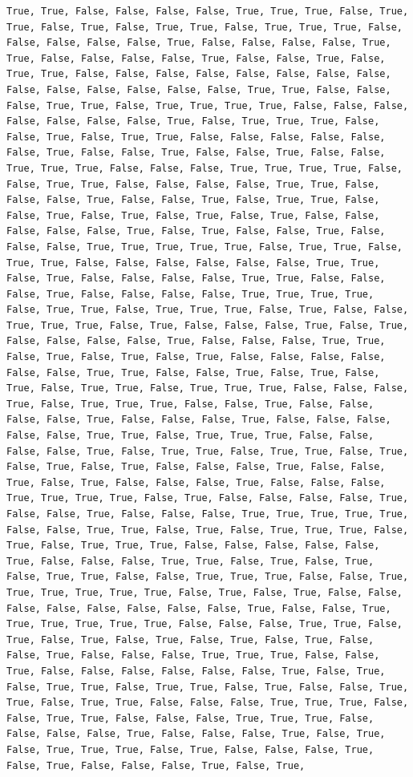 \documentclass[
  letterpaper,
  DIV=11,
  numbers=noendperiod]{scrartcl}
\begin{document}
\begin{verbatim}
True, True, False, False, False, False, True, True, True, False, True, True, False, True, False, True, True, False, True, True, True, False, False, False, False, False, True, False, False, False, False, True, True, False, False, False, False, True, False, False, True, False, True, True, False, False, False, False, False, False, False, False, False, False, False, False, False, False, True, True, False, False, False, True, True, False, True, True, True, True, False, False, False, False, False, False, False, True, False, True, True, True, False, False, True, False, True, True, False, False, False, False, False, False, True, False, False, True, False, False, True, False, False, True, True, True, False, False, False, True, True, True, True, False, False, True, True, False, False, False, False, True, True, False, False, False, True, False, False, True, False, True, True, False, False, True, False, True, False, True, False, True, False, False, False, False, False, True, False, True, False, False, True, False, False, False, True, True, True, True, True, False, True, True, False, True, True, False, False, False, False, False, False, True, True, False, True, False, False, False, False, True, True, False, False, False, True, False, False, False, False, True, True, True, True, False, True, True, False, True, True, True, False, True, False, False, True, True, True, False, True, False, False, False, True, False, True, False, False, False, False, True, False, False, False, True, True, False, True, False, True, False, True, False, False, False, False, False, False, True, True, False, False, True, False, True, False, True, False, True, True, False, True, True, True, False, False, False, True, False, True, True, True, False, False, True, False, False, False, False, True, False, False, False, True, False, False, False, False, False, True, True, False, True, True, True, False, False, False, False, True, False, True, True, False, True, True, False, True, False, True, False, True, False, False, False, True, False, False, True, False, True, False, False, False, True, False, False, False, True, True, True, True, False, True, False, False, False, False, True, False, False, True, False, False, False, True, True, True, True, True, False, False, True, True, False, True, False, True, True, True, False, True, False, True, True, True, False, False, False, False, False, True, False, False, False, True, True, False, True, False, True, False, True, True, False, False, True, True, True, False, False, True, True, True, True, True, True, False, True, False, True, False, False, False, False, False, False, False, False, True, False, False, True, True, True, True, True, True, False, False, False, True, True, False, True, False, True, False, True, False, True, False, True, False, False, True, False, False, False, True, True, True, False, False, True, False, False, False, False, False, False, True, False, True, False, True, True, False, True, True, False, True, False, False, True, True, False, True, True, False, False, False, True, True, True, False, False, True, True, False, False, False, True, True, True, False, False, False, False, True, False, False, False, True, False, True, False, True, True, True, False, True, False, False, False, True, False, True, False, False, False, True, False, True, 
\end{verbatim}
\end{document}

